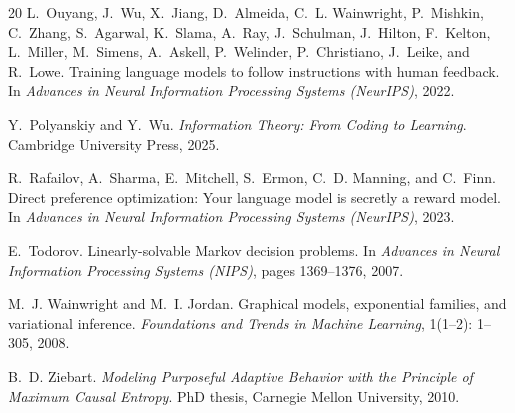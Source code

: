 \documentclass[11pt, a4paper, 
onecolumn, 
showabstract]{naverlabseurope-onecol-flex}
\theoremstyle{definition}
\theoremstyle{remark}
\begin{document}
\begin{thebibliography}{20}
L.~Ouyang, J.~Wu, X.~Jiang, D.~Almeida, C.~L. Wainwright, P.~Mishkin, C.~Zhang, S.~Agarwal, K.~Slama, A.~Ray, J.~Schulman, J.~Hilton, F.~Kelton, L.~Miller, M.~Simens, A.~Askell, P.~Welinder, P.~Christiano, J.~Leike, and R.~Lowe.
Training language models to follow instructions with human feedback.
In \emph{Advances in Neural Information Processing Systems (NeurIPS)}, 2022.

Y.~Polyanskiy and Y.~Wu.
\emph{Information Theory: From Coding to Learning}.
Cambridge University Press, 2025.

R.~Rafailov, A.~Sharma, E.~Mitchell, S.~Ermon, C.~D. Manning, and C.~Finn.
Direct preference optimization: Your language model is secretly a reward model.
In \emph{Advances in Neural Information Processing Systems (NeurIPS)}, 2023.

E.~Todorov.
Linearly-solvable {M}arkov decision problems.
In \emph{Advances in Neural Information Processing Systems (NIPS)}, pages 1369--1376, 2007.

M.~J. Wainwright and M.~I. Jordan.
Graphical models, exponential families, and variational inference.
\emph{Foundations and Trends in Machine Learning}, 1(1--2): 1--305, 2008.

B.~D. Ziebart.
\emph{Modeling Purposeful Adaptive Behavior with the Principle of Maximum Causal Entropy}.
PhD thesis, Carnegie Mellon University, 2010.

\end{thebibliography}
\end{document}
